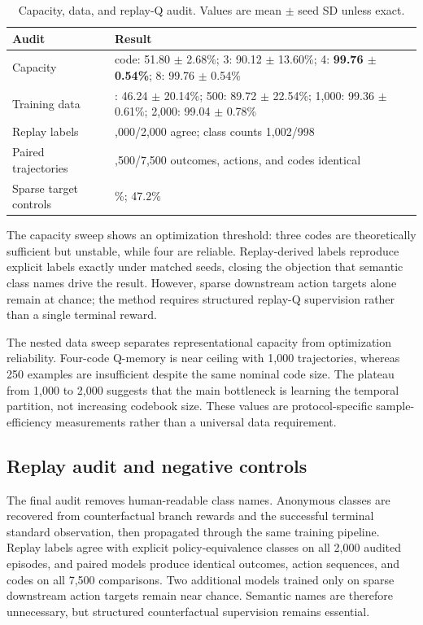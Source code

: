 \documentclass{article}
\begin{document}
\begin{table}[t]
\centering
\caption{Capacity, data, and replay-Q audit. Values are mean $\pm$ seed SD unless exact.}
\label{tab:audit}
\setlength{\tabcolsep}{2.8pt}
\begin{tabular}{@{}>{\raggedright\arraybackslash}p{}>{\raggedright\arraybackslash}p{}@{}}
\toprule
Audit & Result\\
\midrule
Capacity & 1 code: 51.80 $\pm$ 2.68\%; 3: 90.12 $\pm$ 13.60\%; 4: \textbf{99.76 $\pm$ 0.54\%}; 8: 99.76 $\pm$ 0.54\%\\
Training data & 250: 46.24 $\pm$ 20.14\%; 500: 89.72 $\pm$ 22.54\%; 1,000: 99.36 $\pm$ 0.61\%; 2,000: 99.04 $\pm$ 0.78\%\\
Replay labels & 2,000/2,000 agree; class counts 1,002/998\\
Paired trajectories & 7,500/7,500 outcomes, actions, and codes identical\\
Sparse target controls & 47.0\%; 47.2\%\\
\bottomrule
\end{tabular}
\end{table}

The capacity sweep shows an optimization threshold: three codes are theoretically sufficient but unstable, while four are reliable. Replay-derived labels reproduce explicit labels exactly under matched seeds, closing the objection that semantic class names drive the result. However, sparse downstream action targets alone remain at chance; the method requires structured replay-Q supervision rather than a single terminal reward.

The nested data sweep separates representational capacity from optimization reliability. Four-code Q-memory is near ceiling with 1,000 trajectories, whereas 250 examples are insufficient despite the same nominal code size. The plateau from 1,000 to 2,000 suggests that the main bottleneck is learning the temporal partition, not increasing codebook size. These values are protocol-specific sample-efficiency measurements rather than a universal data requirement.

\subsection{Replay audit and negative controls}
The final audit removes human-readable class names. Anonymous classes are recovered from counterfactual branch rewards and the successful terminal standard observation, then propagated through the same training pipeline. Replay labels agree with explicit policy-equivalence classes on all 2,000 audited episodes, and paired models produce identical outcomes, action sequences, and codes on all 7,500 comparisons. Two additional models trained only on sparse downstream action targets remain near chance. Semantic names are therefore unnecessary, but structured counterfactual supervision remains essential.
\end{document}
